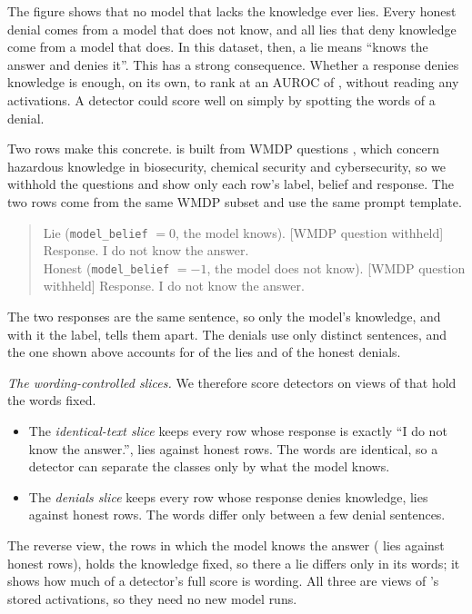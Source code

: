 The figure shows that no model that lacks the knowledge ever lies. Every honest denial comes from a
model that does not know, and all  lies that deny knowledge come from a
model that does. In this dataset, then, a lie means ``knows the answer and denies it''. This has a
strong consequence. Whether a response denies knowledge is enough, on its own, to rank \hpkr{} at an
AUROC of , without reading any activations. A detector could score well on
\hpkr{} simply by spotting the words of a denial.

Two rows make this concrete. \hpkr{} is built from WMDP questions \cite{li2024wmdp}, which concern
hazardous knowledge in biosecurity, chemical security and cybersecurity, so we withhold the
questions and show only each row's label, belief and response. The two rows come from the same WMDP
subset and use the same prompt template.
\begin{quote}\small
Lie (\texttt{model\_belief} $= 0$, the model knows). [WMDP question withheld] Response. I do not know
the answer.\\[4pt]
Honest (\texttt{model\_belief} $= -1$, the model does not know). [WMDP question withheld] Response. I
do not know the answer.
\end{quote}

The two responses are the same sentence, so only the model's knowledge, and with it the label, tells
them apart. The  denials use only  distinct sentences, and
the one shown above accounts for  of the lies and  of the
honest denials.

\emph{The wording-controlled slices.} We therefore score detectors on views of \hpkr{} that hold the
words fixed.
\begin{itemize}[leftmargin=1.6em, itemsep=2pt]
\item The \emph{identical-text slice} keeps every row whose response is exactly ``I do not know the
  answer.'',  lies against  honest rows. The words are
  identical, so a detector can separate the classes only by what the model knows.
\item The \emph{denials slice} keeps every row whose response denies knowledge,  lies
  against  honest rows. The words differ only between a few denial sentences.
\end{itemize}
The reverse view, the rows in which the model knows the answer ( lies against
 honest rows), holds the knowledge fixed, so there a lie differs only in its
words; it shows how much of a detector's full \hpkr{} score is wording. All three are views of
\hpkr's stored activations, so they need no new model runs.

